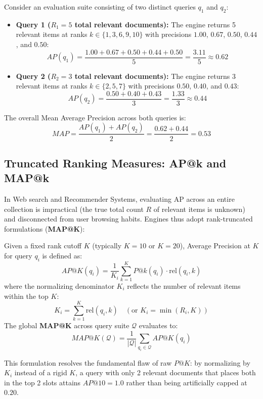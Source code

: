 \begin{example}
Consider an evaluation suite consisting of two distinct queries $q_1$ and $q_2$:
\begin{itemize}
    \item \textbf{Query 1 ($R_1 = 5$ total relevant documents):} The engine returns 5 relevant items at ranks $k \in \{1, 3, 6, 9, 10\}$ with precisions $1.00$, $0.67$, $0.50$, $0.44$, and $0.50$:
    \[
    AP(q_1) = \frac{1.00 + 0.67 + 0.50 + 0.44 + 0.50}{5} = \frac{3.11}{5} \approx \mathbf{0.62}
    \]
    \item \textbf{Query 2 ($R_2 = 3$ total relevant documents):} The engine returns 3 relevant items at ranks $k \in \{2, 5, 7\}$ with precisions $0.50$, $0.40$, and $0.43$:
    \[
    AP(q_2) = \frac{0.50 + 0.40 + 0.43}{3} = \frac{1.33}{3} \approx \mathbf{0.44}
    \]
\end{itemize}
The overall Mean Average Precision across both queries is:
\begin{equation}
MAP = \frac{AP(q_1) + AP(q_2)}{2} = \frac{0.62 + 0.44}{2} = \mathbf{0.53}
\end{equation}
\end{example}

\subsection{Truncated Ranking Measures: AP@k and MAP@k}
In Web search and Recommender Systems, evaluating AP across an entire collection is impractical (the true total count $R$ of relevant items is unknown) and disconnected from user browsing habits.
Engines thus adopt rank-truncated formulations (\textbf{MAP@K}):

\begin{definition}
Given a fixed rank cutoff $K$ (typically $K=10$ or $K=20$), Average Precision at $K$ for query $q_i$ is defined as:
\begin{equation}
AP@K(q_i) = \frac{1}{K_i} \sum_{k=1}^K P@k(q_i) \cdot \mathrm{rel}(q_i, k)
\end{equation}
where the normalizing denominator $K_i$ reflects the number of relevant items within the top $K$:
\begin{equation}
K_i = \sum_{k=1}^K \mathrm{rel}(q_i, k) \quad \left(\text{or } K_i = \min(R_i, K)\right)
\end{equation}
The global \textbf{MAP@K} across query suite $\mathcal{Q}$ evaluates to:
\begin{equation}
MAP@K(\mathcal{Q}) = \frac{1}{|\mathcal{Q}|} \sum_{q_i \in \mathcal{Q}} AP@K(q_i)
\end{equation}
\end{definition}
This formulation resolves the fundamental flaw of raw $P@K$: by normalizing by $K_i$ instead of a rigid $K$, a query with only 2 relevant documents that places both in the top 2 slots attains $AP@10 = 1.0$ rather than being artificially capped at $0.20$.

